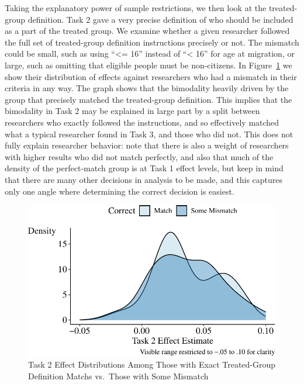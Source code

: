 \documentclass[
  letterpaper,
  DIV=11,
  numbers=noendperiod]{scrartcl}
\begin{document}
Taking the explanatory power of sample restrictions, we then look at the
treated-group definition. Task 2 gave a very precise definition of who
should be included as a part of the treated group. We examine whether a
given researcher followed the full set of treated-group definition
instructions precisely or not. The mismatch could be small, such as
using ``\textless= 16'' instead of ``\textless{} 16'' for age at
migration, or large, such as omitting that eligible people must be
non-citizens. In Figure~\ref{fig-match-vs-mismatch} we show their
distribution of effects against researchers who had a mismatch in their
criteria in any way. The graph shows that the bimodality heavily driven
by the group that precisely matched the treated-group definition. This
implies that the bimodality in Task 2 may be explained in large part by
a split between researchers who exactly followed the instructions, and
so effectively matched what a typical researcher found in Task 3, and
those who did not. This does not fully explain researcher behavior: note
that there is also a weight of researchers with higher results who did
not match perfectly, and also that much of the density of the
perfect-match group is at Task 1 effect levels, but keep in mind that
there are many other decisions in analysis to be made, and this captures
only one angle where determining the correct decision is easiest.

\begin{figure}

{\centering \includegraphics{The-Sources-of-Researcher-Variation-in-Economics_files/figure-pdf/fig-match-vs-mismatch-1.pdf}

}

\caption{\label{fig-match-vs-mismatch}Task 2 Effect Distributions Among
Those with Exact Treated-Group Definition Matchs vs.~Those with Some
Mismatch}

\end{figure}
\end{document}
